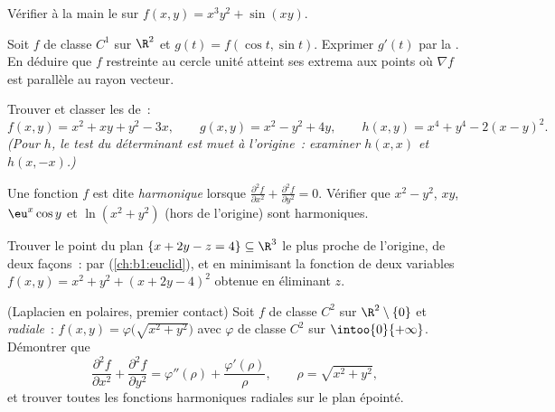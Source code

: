 \begin{exercise}[$\star$]\label{exo:b1:multivar:4}
Vérifier à la main le  sur $f(x, y) = x^3 y^2 + \sin(xy)$.
\end{exercise}

\begin{exercise}[$\star\star$]\label{exo:b1:multivar:5}
Soit $f$ de classe $C^1$ sur $\R^2$ et $g(t) = f(\cos t, \sin t)$.
Exprimer $g'(t)$ par la . En déduire que $f$
restreinte au cercle unité atteint ses extrema aux points où
$\nabla f$ est parallèle au rayon vecteur.
\end{exercise}

\begin{exercise}[$\star\star$]\label{exo:b1:multivar:6}
Trouver et classer les  de~:
\[
f(x, y) = x^2 + xy + y^2 - 3x,
\qquad
g(x, y) = x^2 - y^2 + 4y,
\qquad
h(x, y) = x^4 + y^4 - 2(x - y)^2 .
\]
\emph{(Pour $h$, le test du déterminant est muet à l'origine~:
examiner $h(x, x)$ et $h(x, -x)$.)}
\end{exercise}

\begin{exercise}[$\star\star$]\label{exo:b1:multivar:7}
Une fonction $f$ est dite \emph{harmonique} lorsque
$\frac{\partial^2 f}{\partial x^2} + \frac{\partial^2 f}{\partial
y^2} = 0$. Vérifier que $x^2 - y^2$, $xy$, $\eu^x\cos y$ et
$\ln(x^2 + y^2)$ (hors de l'origine) sont harmoniques.
\end{exercise}

\begin{exercise}[$\star\star\star$]\label{exo:b1:multivar:8}
Trouver le point du plan $\{x + 2y - z = 4\} \subseteq \R^3$ le
plus proche de l'origine, de deux façons~: par  (\cref{ch:b1:euclid}), et en minimisant la fonction de
deux variables $f(x, y) = x^2 + y^2 + (x + 2y - 4)^2$ obtenue en
éliminant $z$.
\end{exercise}

\begin{exercise}[$\star\star\star$]\label{exo:b1:multivar:9}
(Laplacien en  polaires, premier contact) Soit $f$ de
classe $C^2$ sur $\R^2 \setminus \{0\}$ et \emph{radiale}~: $f(x, y) =
\varphi\bigl(\sqrt{x^2+y^2}\bigr)$ avec $\varphi$ de classe $C^2$
sur $\intoo{0}{+\infty}$. Démontrer que
\[
\frac{\partial^2 f}{\partial x^2} + \frac{\partial^2 f}{\partial
y^2} = \varphi''(\rho) + \frac{\varphi'(\rho)}{\rho},
\qquad \rho = \sqrt{x^2 + y^2},
\]
et trouver toutes les fonctions harmoniques radiales sur le plan
épointé.
\end{exercise}

